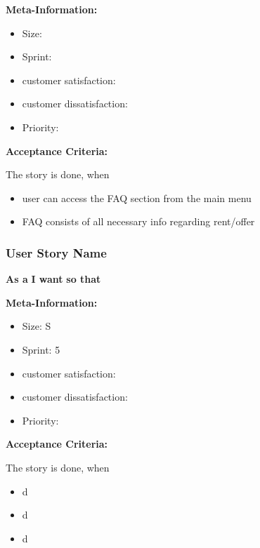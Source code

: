 \textbf{Meta-Information:}
\begin{itemize}
    \item Size:
    \item Sprint:
    \item customer satisfaction:
    \item customer dissatisfaction:
    \item Priority:
\end{itemize}

\textbf{Acceptance Criteria:}

The story is done, when
\begin{itemize}
    \item user can access the FAQ section from the main menu
    \item FAQ consists of all necessary info regarding rent/offer
\end{itemize}

\subsubsection{User Story Name}

\textbf{As a}\hfill\break
\textbf{I want}\hfill\break
\textbf{so that}

\textbf{Meta-Information:}
\begin{itemize}
    \item Size: S
    \item Sprint: 5
    \item customer satisfaction:
    \item customer dissatisfaction:
    \item Priority:
\end{itemize}

\textbf{Acceptance Criteria:}

The story is done, when
\begin{itemize}
    \item d
    \item d
    \item d
\end{itemize}